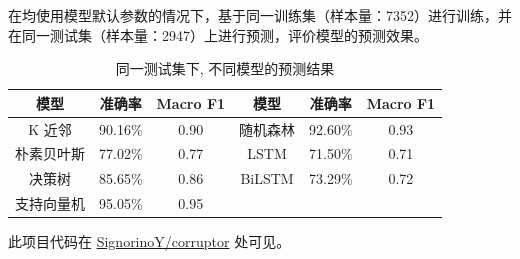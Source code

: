 \documentclass[screen,17pt,cn,founder,mtpro2]{elegantnote}
\begin{document}
在均使用模型默认参数的情况下，基于同一训练集（样本量：7352）进行训练，并在同一测试集（样本量：2947）上进行预测，评价模型的预测效果。

\begin{table}[hpt]
    \centering
    \begin{tabular}{ccc|ccc}
        \toprule
        模型       & 准确率  & Macro F1 & 模型     & 准确率  & Macro F1 \\
        \midrule
        K 近邻     & 90.16\% & 0.90     & 随机森林 & 92.60\% & 0.93     \\
        朴素贝叶斯 & 77.02\% & 0.77     & LSTM     & 71.50\% & 0.71     \\
        决策树     & 85.65\% & 0.86     & BiLSTM   & 73.29\% & 0.72     \\
        支持向量机 & 95.05\% & 0.95     &                               \\
        \bottomrule
    \end{tabular}
    \caption{同一测试集下, 不同模型的预测结果}
\end{table}

此项目代码在 \href{https://github.com/SignorinoY/corruptor}{SignorinoY/corruptor} 处可见。
\clearpage


\end{document}
